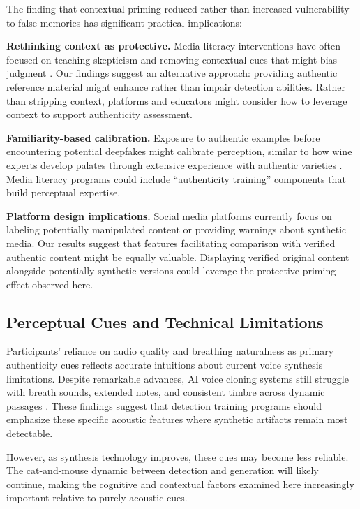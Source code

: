 \documentclass[12pt, a4paper]{article}
\begin{document}
The finding that contextual priming reduced rather than increased vulnerability to false memories has significant practical implications:

\textbf{Rethinking context as protective.} Media literacy interventions have often focused on teaching skepticism and removing contextual cues that might bias judgment \citep{vraga2020news}. Our findings suggest an alternative approach: providing authentic reference material might enhance rather than impair detection abilities. Rather than stripping context, platforms and educators might consider how to leverage context to support authenticity assessment.

\textbf{Familiarity-based calibration.} Exposure to authentic examples before encountering potential deepfakes might calibrate perception, similar to how wine experts develop palates through extensive experience with authentic varieties \citep{hughson2005wine}. Media literacy programs could include ``authenticity training'' components that build perceptual expertise.

\textbf{Platform design implications.} Social media platforms currently focus on labeling potentially manipulated content or providing warnings about synthetic media. Our results suggest that features facilitating comparison with verified authentic content might be equally valuable. Displaying verified original content alongside potentially synthetic versions could leverage the protective priming effect observed here.

\subsection{Perceptual Cues and Technical Limitations}

Participants' reliance on audio quality and breathing naturalness as primary authenticity cues reflects accurate intuitions about current voice synthesis limitations. Despite remarkable advances, AI voice cloning systems still struggle with breath sounds, extended notes, and consistent timbre across dynamic passages \citep{tan2021survey}. These findings suggest that detection training programs should emphasize these specific acoustic features where synthetic artifacts remain most detectable.

However, as synthesis technology improves, these cues may become less reliable. The cat-and-mouse dynamic between detection and generation will likely continue, making the cognitive and contextual factors examined here increasingly important relative to purely acoustic cues.
\end{document}
